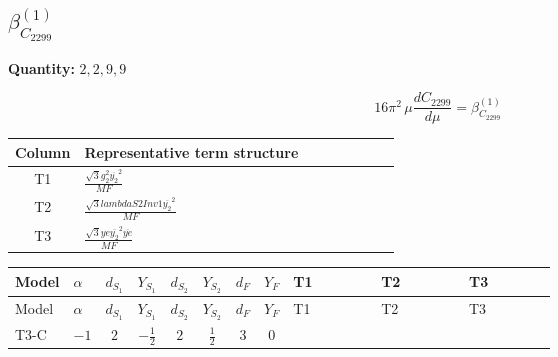 \documentclass[8pt]{article}
\begin{document}
\begin{landscape}
\section*{$\beta_{C_{2299}}^{(1)}$}
\noindent\textbf{Quantity: }$\mathrm{2,2,9,9}$\par\smallskip
\[16\pi^2\,\mu\frac{d C_{2299}}{d\mu}=\beta_{C_{2299}}^{(1)}\]
\begin{center}
\begin{tabular}{@{}c >{\raggedright\arraybackslash}p{0.82\linewidth}@{}}
\toprule
Column & Representative term structure \\
\midrule
T1 & \(\displaystyle \frac{\sqrt{3} g_{2}^{2} \overline{y_{2}}^{2}}{MF}\) \\
\midrule
T2 & \(\displaystyle \frac{\sqrt{3} lambdaS2Inv1 \overline{y_{2}}^{2}}{MF}\) \\
\midrule
T3 & \(\displaystyle \frac{\sqrt{3} ye \overline{y_{2}}^{2} \overline{ye}}{MF}\) \\
\midrule
\bottomrule
\end{tabular}
\end{center}
\smallskip
\tiny
\begin{longtable}{@{}llcccccc >{\raggedright\arraybackslash}p{0.21\linewidth} >{\raggedright\arraybackslash}p{0.21\linewidth} >{\raggedright\arraybackslash}p{0.21\linewidth}@{}}
\toprule
Model & $\alpha$ & $d_{S_1}$ & $Y_{S_1}$ & $d_{S_2}$ & $Y_{S_2}$ & $d_F$ & $Y_F$ & T1 & T2 & T3 \\
\midrule
\endfirsthead
\toprule
Model & $\alpha$ & $d_{S_1}$ & $Y_{S_1}$ & $d_{S_2}$ & $Y_{S_2}$ & $d_F$ & $Y_F$ & T1 & T2 & T3 \\
\midrule
\endhead
T3-C & $-1$ & $2$ & $-\frac{1}{2}$ & $2$ & $\frac{1}{2}$ & $3$ & $0$ & \scriptsize\adjustbox{max width=\linewidth}{$\begin{gathered} - \frac{\sqrt{3} g_{2}^{2} \overline{y_{2}}^{2}}{4 MF}\end{gathered}$} & \scriptsize\adjustbox{max width=\linewidth}{$\begin{gathered} - \frac{\sqrt{3} lambdaS2Inv1 \overline{y_{2}}^{2}}{6 MF}\end{gathered}$} & \scriptsize\adjustbox{max width=\linewidth}{$\begin{gathered} \frac{\sqrt{3} ye \overline{y_{2}}^{2} \overline{ye}}{12 MF}\end{gathered}$} \\
\midrule
\bottomrule
\end{longtable}
\clearpage

\end{landscape}
\end{document}
